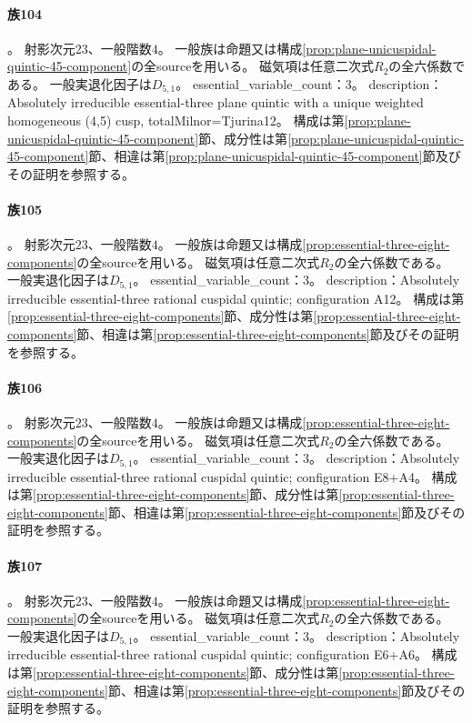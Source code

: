 \paragraph{族104}\label{catalogue:R4_PLANE_UNICUSPIDAL_QUINTIC_45_23}
。
射影次元$23$、一般階数$4$。
一般族は命題又は構成\ref{prop:plane-unicuspidal-quintic-45-component}の全sourceを用いる。
磁気項は任意二次式$R_2$の全六係数である。
一般実退化因子は$D_{5,1}$。
essential\_variable\_count：3。
description：Absolutely irreducible essential-three plane quintic with a unique weighted homogeneous (4,5) cusp, totalMilnor=Tjurina12。
構成は第\ref{prop:plane-unicuspidal-quintic-45-component}節、成分性は第\ref{prop:plane-unicuspidal-quintic-45-component}節、相違は第\ref{prop:plane-unicuspidal-quintic-45-component}節及びその証明を参照する。

\paragraph{族105}\label{catalogue:R4_PLANE_QUINTIC_A12_23}
。
射影次元$23$、一般階数$4$。
一般族は命題又は構成\ref{prop:essential-three-eight-components}の全sourceを用いる。
磁気項は任意二次式$R_2$の全六係数である。
一般実退化因子は$D_{5,1}$。
essential\_variable\_count：3。
description：Absolutely irreducible essential-three rational cuspidal quintic; configuration A12。
構成は第\ref{prop:essential-three-eight-components}節、成分性は第\ref{prop:essential-three-eight-components}節、相違は第\ref{prop:essential-three-eight-components}節及びその証明を参照する。

\paragraph{族106}\label{catalogue:R4_PLANE_QUINTIC_E8_A4_23}
。
射影次元$23$、一般階数$4$。
一般族は命題又は構成\ref{prop:essential-three-eight-components}の全sourceを用いる。
磁気項は任意二次式$R_2$の全六係数である。
一般実退化因子は$D_{5,1}$。
essential\_variable\_count：3。
description：Absolutely irreducible essential-three rational cuspidal quintic; configuration E8+A4。
構成は第\ref{prop:essential-three-eight-components}節、成分性は第\ref{prop:essential-three-eight-components}節、相違は第\ref{prop:essential-three-eight-components}節及びその証明を参照する。

\paragraph{族107}\label{catalogue:R4_PLANE_QUINTIC_E6_A6_23}
。
射影次元$23$、一般階数$4$。
一般族は命題又は構成\ref{prop:essential-three-eight-components}の全sourceを用いる。
磁気項は任意二次式$R_2$の全六係数である。
一般実退化因子は$D_{5,1}$。
essential\_variable\_count：3。
description：Absolutely irreducible essential-three rational cuspidal quintic; configuration E6+A6。
構成は第\ref{prop:essential-three-eight-components}節、成分性は第\ref{prop:essential-three-eight-components}節、相違は第\ref{prop:essential-three-eight-components}節及びその証明を参照する。

